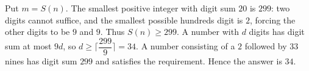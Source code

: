 Put $m=S(n)$. The smallest positive integer with digit sum $20$ is $299$: two digits cannot suffice, and the smallest possible hundreds digit is $2$, forcing the other digits to be $9$ and $9$. Thus $S(n)\ge299$.
A number with $d$ digits has digit sum at most $9d$, so $d\ge\lceil\dfrac{299}{9}\rceil=34$. A number consisting of a $2$ followed by $33$ nines has digit sum $299$ and satisfies the requirement. Hence the answer is $\boxed{34}$.
